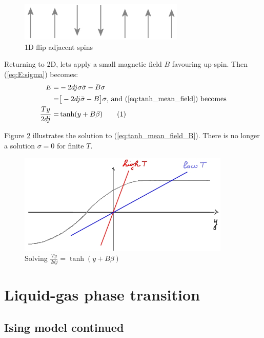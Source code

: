 \documentclass[]{article}
\newcommand\numberthis{\addtocounter{equation}{1}\tag{\theequation}}
\begin{document}
\begin{figure}[H]
	\center
	\caption{1D flip adjacent spins}\label{fig:1D:flip_adjacent}
	\includegraphics[width=0.7\textwidth]{T_zero_aligned_flip}
\end{figure}

Returning to 2D, lets apply a small magnetic field $B$ favouring up-spin. Then (\ref{eq:E:sigma}) becomes:
\begin{align*}
	E =& -2 d j \sigma \bar{\sigma} - B\sigma\\
	=& 	\big[-2 d j  \bar{\sigma} - B\big] \sigma \text{, and (\ref{eq:tanh_mean_field}) becomes}\\
	\frac{T y}{2 d j} =& \tanh(y +B\beta)\numberthis\label{eq:tanh_mean_field_B}
\end{align*}

Figure \ref{fig:tanh_mean_field_B} illustrates the solution to (\ref{eq:tanh_mean_field_B}). There is no longer a solution $\sigma=0$ for finite $T$.
\begin{figure}[H]
	\caption[Solving Mean Field equation]{Solving $\frac{T y}{2 d j} = \tanh(y +B\beta)$}\label{fig:tanh_mean_field_B}
	\includegraphics[width=0.9\textwidth]{tanh_mean_field_B}
\end{figure}


\section{Liquid-gas phase transition}


\subsection{Ising model continued}
\end{document}
